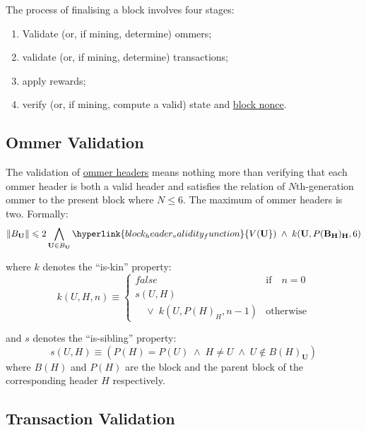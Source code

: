 \documentclass[9pt,oneside]{amsart}
\begin{document}
\begin{multicols}{2}
The process of finalising a block involves four stages:

\begin{enumerate}
\item Validate (or, if mining, determine) ommers;
\item validate (or, if mining, determine) transactions;
\item apply rewards;
\item verify (or, if mining, compute a valid) state and \hyperlink{block_nonce}{block nonce}.
\end{enumerate}

\subsection{Ommer Validation}

The validation of \hyperlink{ommer_block_headers_B__U}{ommer headers} means nothing more than verifying that each ommer header is both a valid header and satisfies the relation of $N$th-generation ommer to the present block where $N \leq 6$. The maximum of ommer headers is two. Formally:
\begin{equation}
\lVert B_{\mathbf{U}} \rVert \leqslant 2 \bigwedge_{\mathbf{U} \in B_{\mathbf{U}}} \hyperlink{block_header_validity_function}{V({\mathbf{U}}})\; \wedge \; k({\mathbf{U}}, P(\mathbf{B}_{\mathbf{H}})_{\mathbf{H}}, 6)
\end{equation}

where $k$ denotes the ``is-kin'' property:
\begin{equation}
k(U, H, n) \equiv \begin{cases} \mathit{false} & \text{if} \quad n = 0 \\
s(U, H) &\\
\quad \vee \; k(U, P(H)_{H}, n - 1) & \text{otherwise}
\end{cases}
\end{equation}

and $s$ denotes the ``is-sibling'' property:
\begin{equation}
s(U, H) \equiv (P(H) = P(U)\; \wedge \; H \neq U \; \wedge \; U \notin B(H)_{\mathbf{U}})
\end{equation}
where $B(H)$ and $P(H)$ are the block and the parent block of the corresponding header $H$ respectively.

\subsection{Transaction Validation}


\end{multicols}
\end{document}
